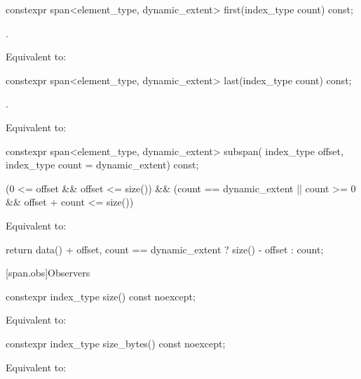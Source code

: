 \begin{codeblock}
\begin{codeblock}
\begin{codeblock}
%
\begin{itemdecl}
constexpr span<element_type, dynamic_extent> first(index_type count) const;
\end{itemdecl}
\begin{itemdescr}
\pnum
\requires
{}.

\pnum
\effects
Equivalent to: 
\end{itemdescr}

%
\begin{itemdecl}
constexpr span<element_type, dynamic_extent> last(index_type count) const;
\end{itemdecl}
\begin{itemdescr}
\pnum
\requires
{}.

\pnum
\effects
Equivalent to: 
\end{itemdescr}

%
\begin{itemdecl}
constexpr span<element_type, dynamic_extent> subspan(
  index_type offset, index_type count = dynamic_extent) const;
\end{itemdecl}
\begin{itemdescr}
\pnum
\requires
\begin{codeblock}
(0 <= offset && offset <= size())
&& (count == dynamic_extent || count >= 0 && offset + count <= size())
\end{codeblock}

\pnum
\effects
Equivalent to:
\begin{codeblock}
return {data() + offset, count == dynamic_extent ? size() - offset : count};
\end{codeblock}
\end{itemdescr}

[span.obs]{Observers}

%
\begin{itemdecl}
constexpr index_type size() const noexcept;
\end{itemdecl}
\begin{itemdescr}
\pnum
\effects
Equivalent to: 
\end{itemdescr}

%
\begin{itemdecl}
constexpr index_type size_bytes() const noexcept;
\end{itemdecl}
\begin{itemdescr}
\pnum
\effects
Equivalent to: 
\end{itemdescr}


\end{codeblock}
\end{codeblock}
\end{codeblock}

